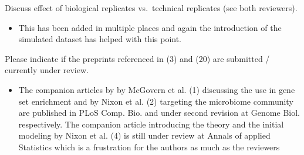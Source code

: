 \documentclass[
]{article}
\providecommand{\tightlist}{%
  \setlength{\itemsep}{0pt}\setlength{\parskip}{0pt}}
\begin{document}
Discuss effect of biological replicates vs.~technical replicates (see
both reviewers).

\begin{itemize}
\tightlist
\item
  This has been added in multiple places and again the introduction of
  the simulated dataset has helped with this point.
\end{itemize}

Please indicate if the preprints referenced in (3) and (20) are
submitted / currently under review.

\begin{itemize}
\tightlist
\item
  The companion articles by by McGovern et al. (1) discussing the use in
  gene set enrichment and by Nixon et al. (2) targeting the microbiome
  community are published in PLoS Comp. Bio. and under second revision
  at Genome Biol. respectively. The companion article introducing the
  theory and the initial modeling by Nixon et al. (4) is still under
  review at Annals of applied Statistics which is a frustration for the
  authors as much as the reviewers
\end{itemize}
\end{document}
